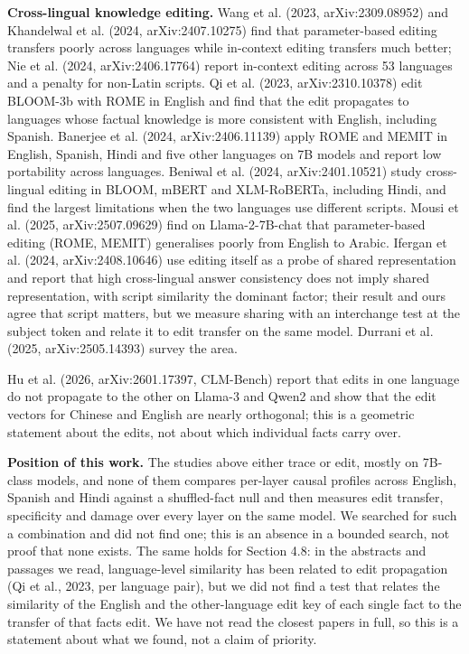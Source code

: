 \documentclass[11pt]{article}
\begin{document}
\textbf{Cross-lingual knowledge editing.} Wang et al. (2023, arXiv:2309.08952) and Khandelwal et al. (2024, arXiv:2407.10275) find that parameter-based editing transfers poorly across languages while in-context editing transfers much better; Nie et al. (2024, arXiv:2406.17764) report in-context editing across 53 languages and a penalty for non-Latin scripts. Qi et al. (2023, arXiv:2310.10378) edit BLOOM-3b with ROME in English and find that the edit propagates to languages whose factual knowledge is more consistent with English, including Spanish. Banerjee et al. (2024, arXiv:2406.11139) apply ROME and MEMIT in English, Spanish, Hindi and five other languages on 7B models and report low portability across languages. Beniwal et al. (2024, arXiv:2401.10521) study cross-lingual editing in BLOOM, mBERT and XLM-RoBERTa, including Hindi, and find the largest limitations when the two languages use different scripts. Mousi et al. (2025, arXiv:2507.09629) find on Llama-2-7B-chat that parameter-based editing (ROME, MEMIT) generalises poorly from English to Arabic. Ifergan et al. (2024, arXiv:2408.10646) use editing itself as a probe of shared representation and report that high cross-lingual answer consistency does not imply shared representation, with script similarity the dominant factor; their result and ours agree that script matters, but we measure sharing with an interchange test at the subject token and relate it to edit transfer on the same model. Durrani et al. (2025, arXiv:2505.14393) survey the area.

Hu et al. (2026, arXiv:2601.17397, CLM-Bench) report that edits in one language do not propagate to the other on Llama-3 and Qwen2 and show that the edit vectors for Chinese and English are nearly orthogonal; this is a geometric statement about the edits, not about which individual facts carry over.

\textbf{Position of this work.} The studies above either trace or edit, mostly on 7B-class models, and none of them compares per-layer causal profiles across English, Spanish and Hindi against a shuffled-fact null and then measures edit transfer, specificity and damage over every layer on the same model. We searched for such a combination and did not find one; this is an absence in a bounded search, not proof that none exists. The same holds for Section 4.8: in the abstracts and passages we read, language-level similarity has been related to edit propagation (Qi et al., 2023, per language pair), but we did not find a test that relates the similarity of the English and the other-language edit key of each single fact to the transfer of that fact\textquotesingle s edit. We have not read the closest papers in full, so this is a statement about what we found, not a claim of priority.
\end{document}
